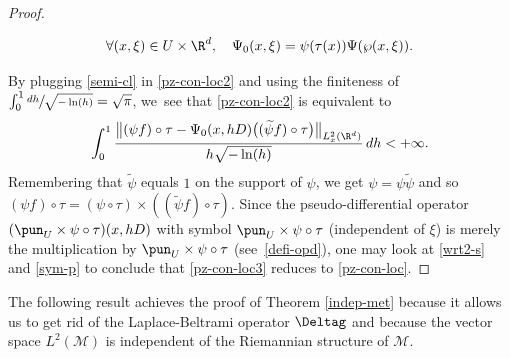 \begin{proof}
\begin{enumeratei}
\begin{equation}
\forall (x,\xi)\in U\times \R^d, \quad \Psi_0(x,\xi)=\psi(\tau(x))\Psi(\wp(x,\xi)).
\end{equation}
\end{enumeratei}
By plugging \eqref{semi-cl} in \eqref{pz-con-loc2} and using the finiteness of $\int_{0}^{1} \sfrac{dh}{\sqrt{-\ln(h)}}=\sqrt{\pi}$, we~see that \eqref{pz-con-loc2} is equivalent to
\begin{equation}\label{pz-con-loc3}
\int_{0}^1 \frac{\bigl\|(\psi f)\circ \tau-\Psi_0(x,hD)\bigl((\widetilde{\psi}f)\circ \tau \bigr)\bigr\|_{L_x^2(\R^d)}}{h\sqrt{-\ln(h)}}\, dh<+\infty.
\end{equation}
Remembering that $\widetilde{\psi}$ equals $1$ on the support of $\psi$, we get $\psi=\psi\widetilde{\psi}$ and so
$(\psi f)\circ \tau=(\psi\circ \tau)\times ((\widetilde{\psi}f)\circ \tau)$.
Since the pseudo-differential operator $(\pun_{U}\times \psi\circ \tau)(x,hD)$ with symbol $\pun_{U}\times \psi\circ \tau$ (independent of $\xi$) is merely the multiplication by $\pun_{U}\times \psi\circ \tau$ (see~\eqref{defi-opd}), one may look at \eqref{wrt2-s} and \eqref{sym-p} to conclude that \eqref{pz-con-loc3} reduces to \eqref{pz-con-loc}.
\end{proof}

The following result achieves the proof of Theorem \ref{indep-met} because it allows us to get rid of the Laplace-Beltrami operator $\Deltag$ and because the vector space $L^2(\mathcal{M})$ is independent of the Riemannian structure of $\mathcal{M}$.

